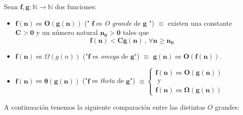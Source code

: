 \documentclass[twoside]{report}
\newcommand{\bs}[1]{\boldsymbol{#1}}
\begin{document}
 Sean $\bs{f,g:\mathbb{N}\rightarrow\mathbb{N}}$ dos funciones:

 \vspace{0.3cm}

 \begin{itemize}
   \item $\bs{f(n)}$ es $\bs{O(g(n))}$ (" $\bs{f}$ es \emph{O grande} de $\bs{g}$ ") $\bs{\equiv}$ existen una constante $\bs{C>0}$ y un número natural $\bs{n_0>0}$ tales que $$\bs{f(n)<Cg(n)\,,\,\forall n\geq n_0}$$

   \vspace{0.3cm}

   \item $\bs{f(n)}$ es ${\Omega(g(n))}$ ("$\bs{f}$ es \emph{omega} de $\bs{g}$") $\bs{\equiv}$ $\bs{g(n)}$ es $\bs{O(f(n))}$.

   \vspace{0.3cm}

   \item $\bs{f(n)}$ es $\bs{\theta(g(n))}$ ("$\bs{f}$ es \emph{theta} de $\bs{g}$") $\bs{\equiv}
            \left\{\begin{array}{c}
                \bs{f(n)} \mbox{  es  } \bs{O(g(n))} \\
                \mbox{ y }\\
                \bs{f(n)} \mbox{  es  } \bs{\Omega(g(n))} \
            \end{array}\right.$
 \end{itemize}

\vspace{1.5cm}

%


 A continuación tenemos la siguiente comparación entre las distintas $O$ grandes:

 \vspace{0.4cm}
\end{document}
